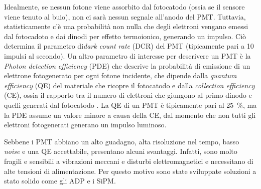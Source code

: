 Idealmente, se nessun fotone viene assorbito dal fotocatodo (ossia se il sensore viene tenuto al buio), non ci sarà nessun segnale all'anodo del PMT. Tuttavia, statisticamente c'è una probabilità non nulla che degli elettroni vengano emessi dal fotocadoto e dai dinodi per effetto termoionico, generando un impulso. Ciò determina il parametro di\textit{dark count rate} (DCR) del PMT (tipicamente pari a 10 impulsi al secondo). 
Un altro parametro di interesse per descrivere un PMT è la \textit{Photon detection efficiency} (PDE) che descrive la probabilità di emissione di un elettrone fotogenerato per ogni fotone incidente, che dipende dalla \textit{quantum efficiency} (QE) del materiale che ricopre il fotocatodo e dalla \textit{collection efficiency} (CE), ossia il rapporto tra il numero di elettroni che giungono al primo dinodo e quelli generati dal fotocatodo \cite{Hai2018}. La QE di un PMT è tipicamente pari al \SI{25}{\percent}, ma la PDE assume un valore minore a causa della CE, dal momento che non tutti gli elettroni fotogenerati generano un impulso luminoso.

Sebbene i PMT abbiano un alto guadagno, alta risoluzione nel tempo, basso \textit{noise} e una QE accettabile, presentano alcuni svantaggi. Infatti, sono molto fragili e sensibili a vibrazioni meccani e disturbi elettromagnetici e necessitano di alte tensioni di alimentazione. Per questo motivo sono state sviluppate soluzioni a stato solido come gli ADP e i SiPM.

\newpage
